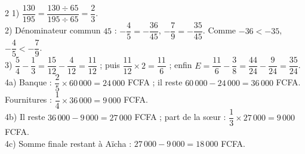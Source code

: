 \begin{multicols}{2}
1) $\dfrac{130}{195}=\dfrac{130\div65}{195\div65}=\dfrac23$.\\
2) Dénominateur commun $45$ : $-\dfrac45=-\dfrac{36}{45}$, $-\dfrac79=-\dfrac{35}{45}$. Comme
$-36<-35$, $-\dfrac45<-\dfrac79$.\\
3) $\dfrac54-\dfrac13=\dfrac{15}{12}-\dfrac4{12}=\dfrac{11}{12}$ ; puis
$\dfrac{11}{12}\times2=\dfrac{11}6$ ; enfin $E=\dfrac{11}6-\dfrac38=\dfrac{44}{24}-\dfrac9{24}=\dfrac{35}{24}$.\\
4a) Banque : $\dfrac25\times60\,000=24\,000$ FCFA ; il reste $60\,000-24\,000=36\,000$ FCFA.
Fournitures : $\dfrac14\times36\,000=9\,000$ FCFA.\\
4b) Il reste $36\,000-9\,000=27\,000$ FCFA ; part de la sœur : $\dfrac13\times27\,000=9\,000$
FCFA.\\
4c) Somme finale restant à Aïcha : $27\,000-9\,000=18\,000$ FCFA.

\end{multicols}
\exercicesBanner
